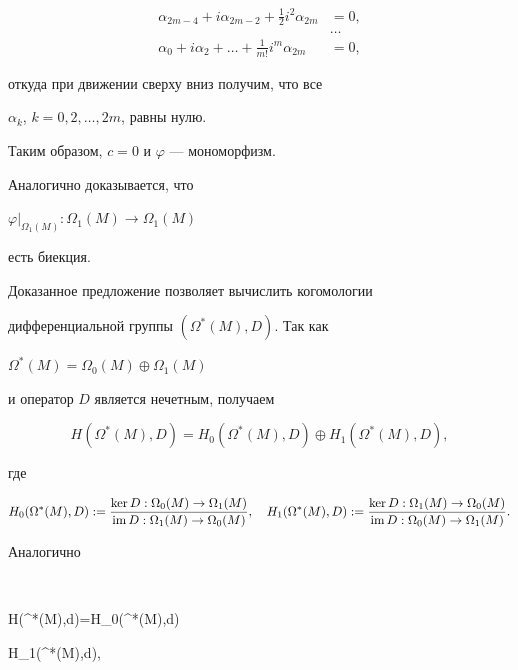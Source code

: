 \begin{pf}
\begin{align*}
\alpha_{2m-4}+i\alpha_{2m-2}+\frac12i^2\alpha_{2m}&=0,\\


&\dotsc\\


\alpha_0+i\alpha_2+\dots+\frac1{m!}i^m\alpha_{2m}&=0,


\end{align*}


откуда при движении сверху вниз получим, что все


$\alpha_k$, $k=0,2,\dotsc,2m$, равны нулю.


Таким образом, $c=0$ и $\varphi$ --- мономорфизм.





Аналогично доказывается, что


$\varphi|_{\Omega_1(M)}:\Omega_1(M)\to\Omega_1(M)$


есть биекция.


\end{pf}





Доказанное предложение позволяет вычислить когомологии


дифференциальной группы $(\Omega^*(M),D)$. Так как


$\Omega^*(M)=\Omega_0(M)\oplus\Omega_1(M)$


и оператор $D$ является нечетным, получаем


$$


H(\Omega^*(M),D)=H_0(\Omega^*(M),D)\oplus


H_1(\Omega^*(M),D),


$$


где


$$


H_0(\Omega^*(M),D):=


\frac{\ker D: \Omega_0(M)\to \Omega_1(M)}


{\im D: \Omega_1(M)\to \Omega_0(M)},


\quad


H_1(\Omega^*(M),D):=


\frac{\ker D: \Omega_1(M)\to \Omega_0(M)}


{\im D: \Omega_0(M)\to \Omega_1(M)}.


$$


Аналогично


$$


H(\Omega^*(M),d)=H_0(\Omega^*(M),d)\oplus


H_1(\Omega^*(M),d),


